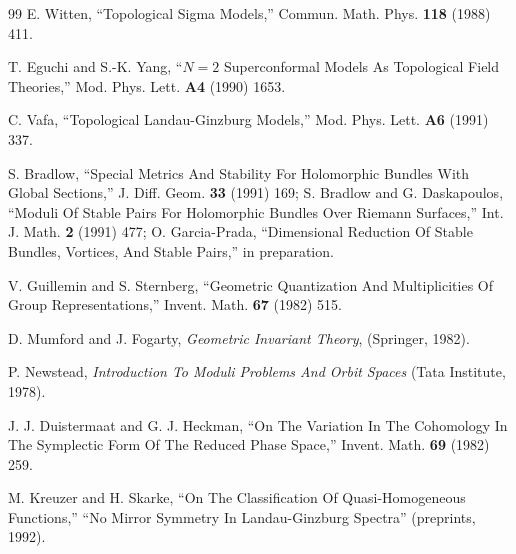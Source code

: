 \begin{thebibliography}{99}
 E. Witten, ``Topological Sigma Models,'' Commun. Math. Phys. \textbf{118} (1988) 411.

 T. Eguchi and S.-K. Yang, ``$N=2$ Superconformal Models As Topological Field Theories,'' Mod. Phys. Lett. \textbf{A4} (1990) 1653.

\label{op:90}
 C. Vafa, ``Topological Landau-Ginzburg Models,'' Mod. Phys. Lett. \textbf{A6} (1991) 337.

 S. Bradlow, ``Special Metrics And Stability For Holomorphic Bundles With Global Sections,'' J. Diff. Geom. \textbf{33} (1991) 169; S. Bradlow and G. Daskapoulos, ``Moduli Of Stable Pairs For Holomorphic Bundles Over Riemann Surfaces,'' Int. J. Math. \textbf{2} (1991) 477; O. Garcia-Prada, ``Dimensional Reduction Of Stable Bundles, Vortices, And Stable Pairs,'' in preparation.

 V. Guillemin and S. Sternberg, ``Geometric Quantization And Multiplicities Of Group Representations,'' Invent. Math. \textbf{67} (1982) 515.

 D. Mumford and J. Fogarty, \textit{Geometric Invariant Theory}, (Springer, 1982).

 P. Newstead, \textit{Introduction To Moduli Problems And Orbit Spaces} (Tata Institute, 1978).

 J. J. Duistermaat and G. J. Heckman, ``On The Variation In The Cohomology In The Symplectic Form Of The Reduced Phase Space,'' Invent. Math. \textbf{69} (1982) 259.

 M. Kreuzer and H. Skarke, ``On The Classification Of Quasi-Homogeneous Functions,'' ``No Mirror Symmetry In Landau-Ginzburg Spectra'' (preprints, 1992).


\end{thebibliography}
